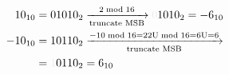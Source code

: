 \documentclass[8pt,a4paper,landscape]{extarticle}
\begin{document}
\begin{multicols*}{3}
\begin{itemize}
  \begin{align*}
  10_{10} & = 01010_{2} \xrightarrow[\text{truncate MSB}]{2 \modu 16} \dimtxt{0}1010_{2} = -6_{10} \\
  -10_{10} & = 10110_{2} \xrightarrow[\text{truncate MSB}]{-10 \modu 16 = 22\text{U} \modu 16 = 6\text{U} = 6 } \\
  & = \dimtxt{1}0110_{2} = 6_{10}
\end{align*}

\end{itemize}


\end{multicols*}
\end{document}
